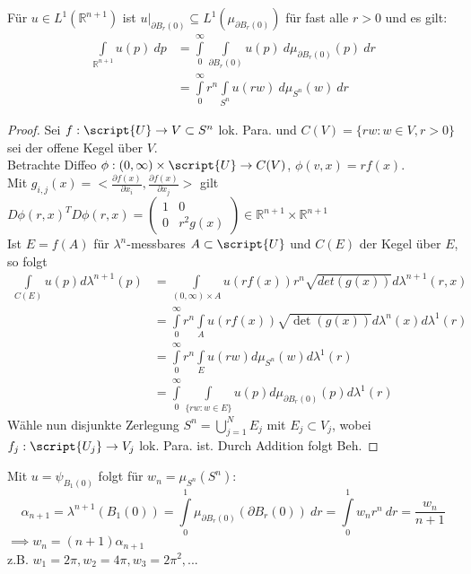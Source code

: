   \begin{theorem}[Zwiebelformel]
    Für $u \in L^1(\mathbb{R}^{n+1})$ ist $u|_{\partial B_r(0)} \subseteq L^1(\mu_{\partial B_r(0)})$ für fast alle $r>0$ und es gilt:
    \begin{align*}
      \int\limits_{\mathbb{R}^{n+1}} u(p) \ dp
      &= \int\limits_0^{\infty} \int\limits_{\partial B_r(0)} u(p) \ d\mu_{\partial B_r(0)}(p)\ dr\\
      &= \int\limits_0^{\infty} r^n \int\limits_{S^n} u(rw) \ d\mu_{S^n}(w)\ dr
    \end{align*}
  \end{theorem}
  \begin{proof}
    Sei $f: \script{U}\to V\subset S^n$ lok. Para. und $C(V) = \{rw: w\in V, r> 0 \}$ sei der offene Kegel über $V$. \\
    Betrachte Diffeo $\phi: (0,\infty) \times \script{U} \to C(V)$, $\phi(v,x) = rf(x)$. \\
    Mit $g_{i,j}(x) = < \frac{\partial f(x)}{\partial x_i}, \frac{\partial f(x)}{\partial x_j}>$ gilt $D\phi (r,x)^T D\phi (r,x) = \begin{pmatrix} 1 & 0 \\ 0 & r^2 g(x) \end{pmatrix} \in \mathbb{R}^{n+1}\times \mathbb{R}^{n+1}$ \\
    Ist $E = f(A)$ für $\lambda^n$-messbares $A\subset \script{U}$ und $C(E)$ der Kegel über $E$, so folgt 
    \begin{align*}
    	\int\limits_{C(E)} u(p) d\lambda^{n+1}(p) &= \int\limits_{(0,\infty)\times A} u(rf(x)) r^n \sqrt{det{(g(x))}} d\lambda^{n+1}(r,x) \\
    	&= \int\limits_0^\infty r^n \int\limits_A u(rf(x)) \sqrt{\det{(g(x))}} d\lambda^n(x) d\lambda^1(r) \\
    	&= \int\limits_0^\infty r^n \int\limits_E u(rw) d\mu_{S^n}(w) d\lambda^1(r) \\
    	&= \int\limits_0^\infty \int\limits_{\{rw: w\in E\} } u(p) d\mu_{\partial B_r(0)}(p) d\lambda^1(r)
    \end{align*}
	Wähle nun disjunkte Zerlegung $S^n = \bigcup\limits_{j=1}^N E_j$ mit $E_j \subset V_j$, wobei $f_j: \script{U_j}\to V_j$ lok. Para. ist. Durch Addition folgt Beh. 
  \end{proof}

  \begin{example}
    Mit $u = \psi_{B_1(0)}$ folgt für $w_n = \mu_{S^n}(S^n)$:
    $$\alpha_{n+1} = \lambda^{n+1}(B_1(0)) = \int\limits_0^1 \mu_{\partial B_r(0)} (\partial B_r(0)) \ dr = \int\limits_0^1 w_n r^n \ dr = \frac{w_n}{n+1}$$
    $\implies w_n = (n+1) \alpha_{n+1}$\\
    z.B. $w_1 = 2\pi, w_2 = 4\pi, w_3 = 2\pi^2, ...$
  \end{example}